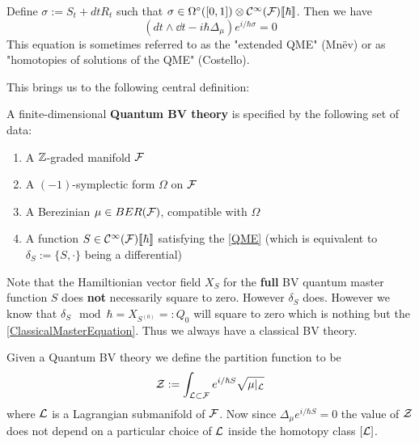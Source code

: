 \begin{definition}
  Define $\sigma := S_t + dt R_t$ such that $\sigma \in \Omega^\circ([0,1]) \otimes \mathcal{C}^{\infty}({\mathcal{F}})\llbracket\hbar\rrbracket$. Then we have
  \begin{equation}\tag{extQME} \label{extendedQME}
    \left( dt \wedge \dd{}{t} - i \hbar \Delta_\mu \right) e^{i/\hbar \sigma} = 0
  \end{equation}
  This equation is sometimes referred to as the "extended QME" (Mn\"{e}v) or as "homotopies of solutions of the QME" (Costello).
\end{definition}

This brings us to the following central definition:

\begin{definition}
  A finite-dimensional \textbf{Quantum BV theory} is specified by the following set of data:
  \begin{enumerate}
    \item A $\mathbb{Z}$-graded manifold ${\mathcal{F}}$
    \item A $(-1)$-symplectic form $\Omega$ on ${\mathcal{F}}$
    \item A Berezinian $\mu \in BER({\mathcal{F}})$, compatible with $\Omega$
    \item A function $S \in \mathcal{C}^{\infty}({\mathcal{F}})\llbracket\hbar\rrbracket$ satisfying the \eqref{QME} (which is equivalent to $\delta_S := \{S, \cdot\}$ being a differential)
  \end{enumerate}
\end{definition}

\begin{rem}
  Note that the Hamiltionian vector field $X_S$ for the \textbf{full} BV quantum master function $S$ does \textbf{not} necessarily square to zero. However $\delta_S$ does. However we know that $\delta_S \mod \hbar = X_{S^{(0)}} =: Q_0$ will square to zero which is nothing but the \eqref{ClassicalMasterEquation}. Thus we always have a classical BV theory.
\end{rem}

Given a Quantum BV theory we define the partition function to be
\begin{equation}
  \mathcal{Z} := \int_{\mathcal{L} \subset {\mathcal{F}}} e^{i/\hbar S} \sqrt{\mu|_{\mathcal{L}}}
\end{equation}
where $\mathcal{L}$ is a Lagrangian submanifold of ${\mathcal{F}}$. Now since $\Delta_\mu e^{i/\hbar S} = 0$ the value of $\mathcal{Z}$ does not depend on a particular choice of $\mathcal{L}$ inside the homotopy class $[\mathcal{L}]$.\\

